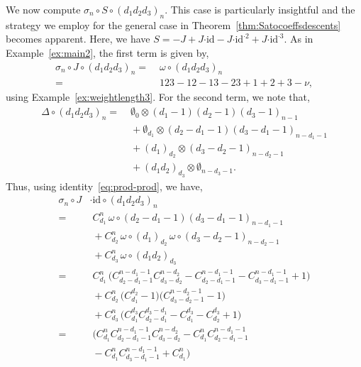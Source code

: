 \documentclass[5p,twocolumn]{elsarticle}
\newcommand*{\id}{{\mathrm{id}}}
\newcommand*{\cendot}{\boldsymbol{\cdot}}
\begin{document}
%
\begin{example}\label{ex:main3}
  We now compute $\sigma_n\circ S\circ (d_1d_2d_3)_n$. This case is particularly insightful and the strategy we employ for the general case in Theorem~\ref{thm:Satocoeffsdescents}
  becomes apparent. Here, we have $S=-J+J\cendot\id-J\cendot\id^{\cendot2}+J\cendot\id^{\cendot3}$. As in Example~\ref{ex:main2}, the first term is given by,
  \begin{align*}
    \sigma_n\circ J\circ (d_1d_2d_3)_n=&\;\omega\circ (d_1d_2d_3)_n\\
                                     =&\;123-12-13-23+1+2+3-\nu,
  \end{align*}
  using Example~\ref{ex:weightlength3}. For the second term, we note that,
  \begin{align*}
    \Delta\circ(d_1d_2d_3)_n=&\;\emptyset_0\otimes(d_1\!-\!1)(d_2\!-\!1)(d_3\!-\!1)_{n-1}\\
                               &\;+\emptyset_{d_1}\otimes(d_2\!-\!d_1\!-\!1)(d_3\!-\!d_1\!-\!1)_{n-d_1-1}\\
                               &\;+(d_1)_{d_2}\otimes(d_3\!-\!d_2\!-\!1)_{n-d_2-1}\\
                               &\;+(d_1d_2)_{d_3}\otimes\emptyset_{n-d_3-1}.
  \end{align*}
  Thus, using identity~\eqref{eq:prod-prod}, we have, 
  \begin{align*}
    \sigma_n\circ J&\cendot\id\circ (d_1d_2d_3)_n\\
                 =&\;C_{d_1}^n\,\omega\circ(d_2-d_1-1)(d_3-d_1-1)_{n-d_1-1}\\
                  &\;+C_{d_2}^n\,\omega\circ(d_1)_{d_2}\,\omega\circ(d_3-d_2-1)_{n-d_2-1}\\
                  &\;+C_{d_3}^n\,\omega\circ(d_1d_2)_{d_3}\\
                 =&\;C_{d_1}^n\,\bigl(C_{d_2-d_1-1}^{n-d_1-1} C_{d_3-d_2}^{n-d_2}-C_{d_2-d_1-1}^{n-d_1-1}-C_{d_3-d_1-1}^{n-d_1-1}+1\bigr)\\ 
                  &\;+C_{d_2}^n\,\bigl(C_{d_1}^{d_2}-1\bigr)\bigl(C_{d_3-d_2-1}^{n-d_2-1}-1\bigr)\\ 
                  &\;+C_{d_3}^n\,\bigl(C_{d_1}^{d_3} C_{d_2-d_1}^{d_3-d_1}-C_{d_1}^{d_3}-C_{d_2}^{d_3}+1\bigr)\\             
                 =&\;\bigl(C_{d_1}^nC_{d_2-d_1-1}^{n-d_1-1}C_{d_3-d_2}^{n-d_2}-C_{d_1}^nC_{d_2-d_1-1}^{n-d_1-1}\\
                  &\;-C_{d_1}^nC_{d_3-d_1-1}^{n-d_1-1}+C_{d_1}^n\bigr)\\

\end{align*}
\end{example}
\end{document}
